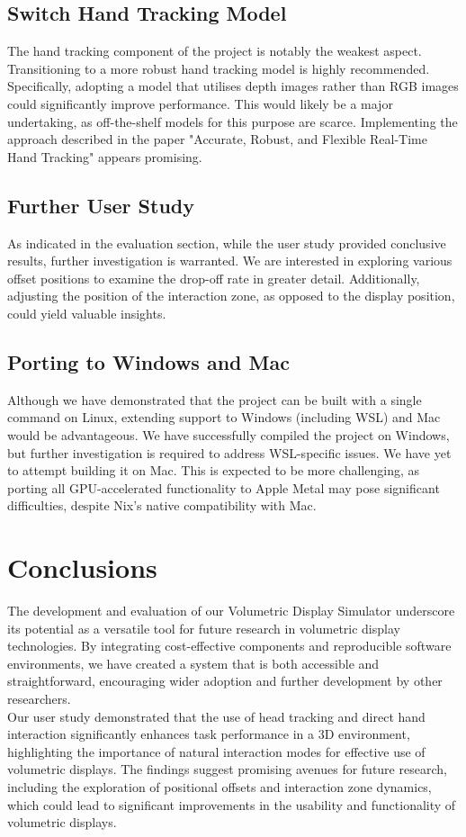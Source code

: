 \subsection{Switch Hand Tracking Model}
The hand tracking component of the project is notably the weakest aspect. Transitioning to a more robust hand tracking model is highly recommended. Specifically, adopting a model that utilises depth images rather than RGB images could significantly improve performance. This would likely be a major undertaking, as off-the-shelf models for this purpose are scarce. Implementing the approach described in the paper "Accurate, Robust, and Flexible Real-Time Hand Tracking" \cite{sharp2015accurate} appears promising.

\subsection{Further User Study}
As indicated in the evaluation section, while the user study provided conclusive results, further investigation is warranted. We are interested in exploring various offset positions to examine the drop-off rate in greater detail. Additionally, adjusting the position of the interaction zone, as opposed to the display position, could yield valuable insights.

\subsection{Porting to Windows and Mac}
Although we have demonstrated that the project can be built with a single command on Linux, extending support to Windows (including WSL) and Mac would be advantageous. We have successfully compiled the project on Windows, but further investigation is required to address WSL-specific issues. We have yet to attempt building it on Mac. This is expected to be more challenging, as porting all GPU-accelerated functionality to Apple Metal \cite{noauthor_httpsdeveloperapplecommetalmetal-shading-language-specificationpdf_nodate} may pose significant difficulties, despite Nix's native compatibility with Mac.

\section{Conclusions}

The development and evaluation of our Volumetric Display Simulator underscore its potential as a versatile tool for future research in volumetric display technologies. By integrating cost-effective components and reproducible software environments, we have created a system that is both accessible and straightforward, encouraging wider adoption and further development by other researchers. \\

Our user study demonstrated that the use of head tracking and direct hand interaction significantly enhances task performance in a 3D environment, highlighting the importance of natural interaction modes for effective use of volumetric displays. The findings suggest promising avenues for future research, including the exploration of positional offsets and interaction zone dynamics, which could lead to significant improvements in the usability and functionality of volumetric displays.